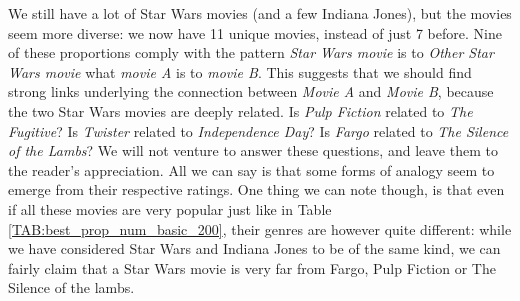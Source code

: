 We still have a lot of Star Wars movies (and a few Indiana Jones), but the
movies seem more diverse: we now have 11 unique movies, instead of just 7
before. Nine of these proportions comply with the pattern \textit{Star Wars
movie} is to \textit{Other Star Wars movie} what \textit{movie A} is to
\textit{movie B}. This suggests that we should find strong links underlying the
connection between \textit{Movie A} and \textit{Movie B}, because the two Star
Wars movies are deeply related. Is \textit{Pulp Fiction} related to \textit{The
Fugitive}? Is \textit{Twister} related to \textit{Independence Day}? Is
\textit{Fargo} related to \textit{The Silence of the Lambs}? We will not
venture to answer these questions, and leave them to the reader's appreciation.
All we can say is that some forms of analogy seem to emerge from their
respective ratings.  One thing we can note though, is that even if all these
movies are very popular just like in Table \ref{TAB:best_prop_num_basic_200},
their genres are however quite different: while we have considered Star Wars
and Indiana Jones to be of the same kind, we can fairly claim that a Star Wars
movie is very far from Fargo, Pulp Fiction or The Silence of the lambs.

